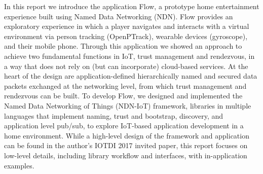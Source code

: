 In this report we introduce the application Flow, a prototype home entertainment experience built using Named Data Networking (NDN). Flow provides an exploratory experience in which a player navigates and interacts with a virtual environment via person tracking (OpenPTrack), wearable devices (gyroscope), and their mobile phone. 
Through this application we showed an approach to achieve two fundamental functions in IoT, trust management and rendezvous, in a way that does not rely on (but can incorporate) cloud-based services.
At the heart of the design are application-defined hierarchically named and secured data packets exchanged at the networking level, from which trust management and rendezvous can be built. 
To develop Flow, we designed and implemented the Named Data Networking of Things (NDN-IoT) framework, libraries in multiple languages that implement naming, trust and bootstrap, discovery, and application level pub/sub, to explore IoT-based application development in a home environment.
While a high-level design of the framework and application can be found in the author's IOTDI 2017 invited paper, this report focuses on low-level details, including library workflow and interfaces, with in-application examples.

